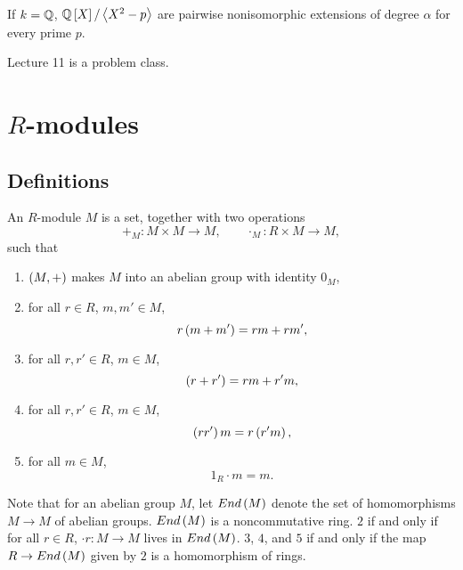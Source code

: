 If $ k = \mathbb{Q} $, $ \mathbb{Q}\left[ X \right] / \left\langle X^2 - p \right\rangle $ are pairwise nonisomorphic extensions of degree $ \alpha $ for every prime $ p $.


Lecture 11 is a problem class.

\pagebreak


\section{$ R $-modules}

\subsection{Definitions}

\begin{definition}
An $ R $-module $ M $ is a set, together with two operations
$$ +_M : M \times M \to M, \qquad \cdot_M : R \times M \to M, $$
such that
\begin{enumerate}
\item $ \left( M, + \right) $ makes $ M $ into an abelian group with identity $ 0_M $,
\item for all $ r \in R $, $ m, m' \in M $,
$$ r\left( m + m' \right) = rm + rm', $$
\item for all $ r, r' \in R $, $ m \in M $,
$$ \left( r + r' \right) = rm + r'm, $$
\item for all $ r, r' \in R $, $ m \in M $,
$$ \left( rr' \right)m = r\left( r'm \right), $$
\item for all $ m \in M $,
$$ 1_R \cdot m = m. $$
\end{enumerate}
\end{definition}

Note that for an abelian group $ M $, let $ End\left( M \right) $ denote the set of homomorphisms $ M \to M $ of abelian groups. $ End\left( M \right) $ is a noncommutative ring. $ 2 $ if and only if for all $ r \in R $, $ \cdot r : M \to M $ lives in $ End\left( M \right) $. $ 3 $, $ 4 $, and $ 5 $ if and only if the map $ R \to End\left( M \right) $ given by $ 2 $ is a homomorphism of rings.


